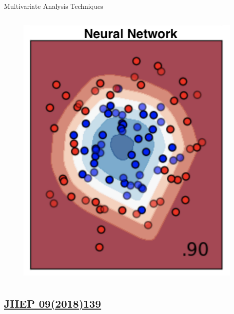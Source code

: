 \documentclass[aspectratio=169,xcolor=table]{beamer}
\begin{document}
\begin{frame}[t]{Multivariate Analysis Techniques}
\begin{columns}
        \begin{figure}
          \begin{columns}
          \centering
          \includegraphics[height=.35\textheight,keepaspectratio=true]{PNN_Example.png}
          \caption{\tiny \cite{scikit}}
          \end{columns}
        \end{figure}

    \end{columns}
    \end{frame}

  \subsection{\href{https://link.springer.com/article/10.1007/JHEP09(2018)139}{JHEP 09(2018)139}}
\end{document}
